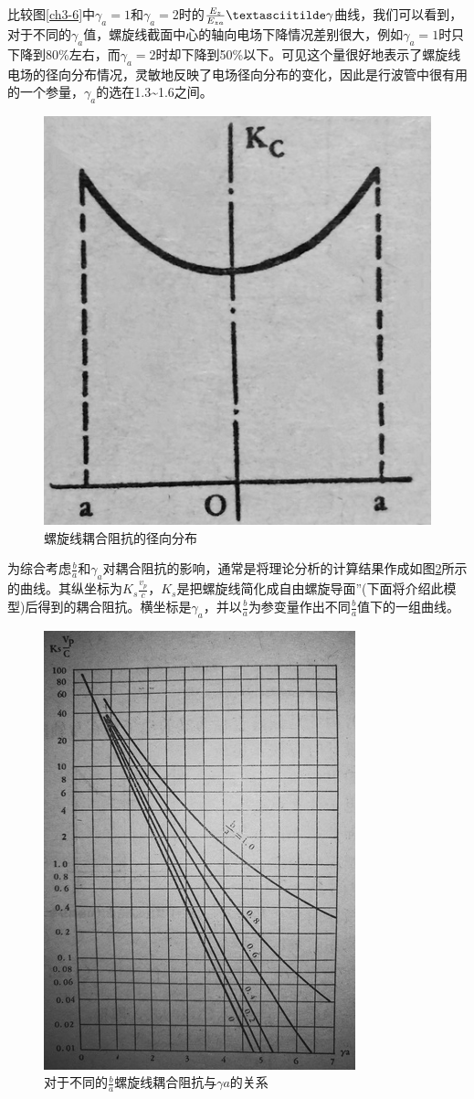 比较图\ref{ch3-6}中$ \gamma_a = 1 $和$ \gamma_a = 2 $时的$ \frac{E_z}{E_{za}} \textasciitilde \gamma$曲线，我们可以看到，对于不同的$ \gamma_a $值，螺旋线截面中心的轴向电场下降情况差别很大，例如$ \gamma_a = 1 $时只下降到80\%左右，而$ \gamma_a = 2 $时却下降到50\%以下。可见这个量很好地表示了螺旋线电场的径向分布情况，灵敏地反映了电场径向分布的变化，因此是行波管中很有用的一个参量，$ \gamma_a $的选在1.3\textasciitilde1.6之间。
\begin{figure}[phtb]
	\centering
	\includegraphics[width=0.3\linewidth]{figure/ch3-7}
	\caption{螺旋线耦合阻抗的径向分布}
	\label{ch3-7}
\end{figure}


为综合考虑$ \frac{b}{a} $和$ \gamma_a $对耦合阻抗的影响，通常是将理论分析的计算结果作成如图\ref{ch3-8}所示的曲线。其纵坐标为$ K_s\frac{v_p}{c} $，$ K_s $是把螺旋线简化成自由螺旋导面”(下面将介绍此模型)后得到的耦合阻抗。横坐标是$ \gamma_a $，并以$ \frac{b}{a} $为参变量作出不同$ \frac{b}{a} $值下的一组曲线。

\begin{figure}[phtb]
	\centering
	\includegraphics[width=0.5\linewidth]{figure/ch3-8}
	\caption{对于不同的$ \frac{b}{a} $螺旋线耦合阻抗与$ \gamma a $的关系}
	\label{ch3-8}
\end{figure}






